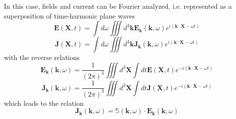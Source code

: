 \documentclass[a4paper,12pt]{article}%
\begin{document}
In this case, fields and current can be Fourier analyzed, i.e. represented as
a superposition of time-harmonic plane waves%
\begin{equation}
\mathbf{E}\left(  \mathbf{X},t\right)  =\int d\omega%
{\displaystyle\iiint}
d^{3}\mathbf{kE}_{\mathbf{k}}\left(  \mathbf{k},\omega\right)  e^{i\left(
\mathbf{k\cdot X}-\omega t\right)  }%
\end{equation}%
\begin{equation}
\mathbf{J}\left(  \mathbf{X},t\right)  =\int d\omega%
{\displaystyle\iiint}
d^{3}\mathbf{kJ}_{\mathbf{k}}\left(  \mathbf{k},\omega\right)  e^{i\left(
\mathbf{k\cdot X}-\omega t\right)  }%
\end{equation}
with the reverse relations%
\begin{equation}
\mathbf{E}_{\mathbf{k}}\left(  \mathbf{k},\omega\right)  =\dfrac{1}{\left(
2\pi\right)  ^{3}}%
{\displaystyle\iiint}
d^{3}\mathbf{X}\int dt\mathbf{E}\left(  \mathbf{X},t\right)  e^{-i\left(
\mathbf{k\cdot X}-\omega t\right)  }%
\end{equation}%
\begin{equation}
\mathbf{J}_{\mathbf{k}}\left(  \mathbf{k},\omega\right)  =\dfrac{1}{\left(
2\pi\right)  ^{3}}%
{\displaystyle\iiint}
d^{3}\mathbf{X}\int dt\mathbf{J}\left(  \mathbf{X},t\right)  e^{-i\left(
\mathbf{k\cdot X}-\omega t\right)  }%
\end{equation}
which leads to the relation%
\begin{equation}
\mathbf{J}_{\mathbf{k}}\left(  \mathbf{k},\omega\right)  =\mathbb{S}\left(
\mathbf{k},\omega\right)  \cdot\mathbf{E}_{\mathbf{k}}\left(  \mathbf{k}%
,\omega\right)  \label{constitutivefourier}%
\end{equation}
\end{document}
